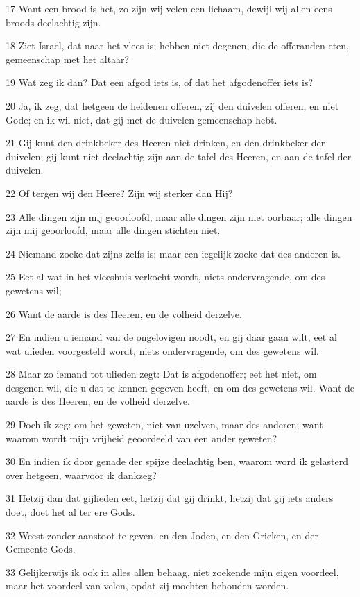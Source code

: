 \par 17 Want een brood is het, zo zijn wij velen een lichaam, dewijl wij allen eens broods deelachtig zijn.
\par 18 Ziet Israel, dat naar het vlees is; hebben niet degenen, die de offeranden eten, gemeenschap met het altaar?
\par 19 Wat zeg ik dan? Dat een afgod iets is, of dat het afgodenoffer iets is?
\par 20 Ja, ik zeg, dat hetgeen de heidenen offeren, zij den duivelen offeren, en niet Gode; en ik wil niet, dat gij met de duivelen gemeenschap hebt.
\par 21 Gij kunt den drinkbeker des Heeren niet drinken, en den drinkbeker der duivelen; gij kunt niet deelachtig zijn aan de tafel des Heeren, en aan de tafel der duivelen.
\par 22 Of tergen wij den Heere? Zijn wij sterker dan Hij?
\par 23 Alle dingen zijn mij geoorloofd, maar alle dingen zijn niet oorbaar; alle dingen zijn mij geoorloofd, maar alle dingen stichten niet.
\par 24 Niemand zoeke dat zijns zelfs is; maar een iegelijk zoeke dat des anderen is.
\par 25 Eet al wat in het vleeshuis verkocht wordt, niets ondervragende, om des gewetens wil;
\par 26 Want de aarde is des Heeren, en de volheid derzelve.
\par 27 En indien u iemand van de ongelovigen noodt, en gij daar gaan wilt, eet al wat ulieden voorgesteld wordt, niets ondervragende, om des gewetens wil.
\par 28 Maar zo iemand tot ulieden zegt: Dat is afgodenoffer; eet het niet, om desgenen wil, die u dat te kennen gegeven heeft, en om des gewetens wil. Want de aarde is des Heeren, en de volheid derzelve.
\par 29 Doch ik zeg: om het geweten, niet van uzelven, maar des anderen; want waarom wordt mijn vrijheid geoordeeld van een ander geweten?
\par 30 En indien ik door genade der spijze deelachtig ben, waarom word ik gelasterd over hetgeen, waarvoor ik dankzeg?
\par 31 Hetzij dan dat gijlieden eet, hetzij dat gij drinkt, hetzij dat gij iets anders doet, doet het al ter ere Gods.
\par 32 Weest zonder aanstoot te geven, en den Joden, en den Grieken, en der Gemeente Gods.
\par 33 Gelijkerwijs ik ook in alles allen behaag, niet zoekende mijn eigen voordeel, maar het voordeel van velen, opdat zij mochten behouden worden.

